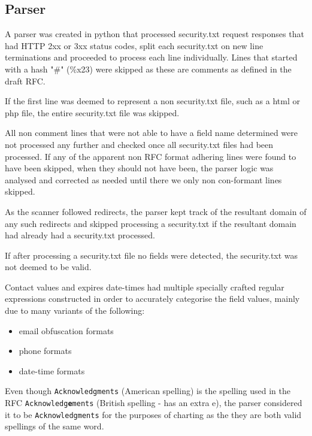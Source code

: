 \documentclass{mscreport}
\begin{document}
\subsection{Parser}

A parser was created in python that processed security.txt request responses that had HTTP 2xx or 3xx status codes, split each security.txt on new line terminations and proceeded to process each line individually. Lines that started with a hash "\#" (\%x23) were skipped as these are comments as defined in the draft RFC.

\vspace{0.3cm} \noindent
If the first line was deemed to represent a non security.txt file, such as a html or php file, the entire security.txt file was skipped.

\vspace{0.3cm} \noindent
All non comment lines that were not able to have a field name determined were not processed any further and checked once all security.txt files had been processed. If any of the apparent non RFC format adhering lines were found to have been skipped, when they should not have been, the parser logic was analysed and corrected as needed until there we only non con-formant lines skipped.

\vspace{0.3cm} \noindent
As the scanner followed redirects, the parser kept track of the resultant domain of any such redirects and skipped processing a security.txt if the resultant domain had already had a security.txt processed.

\vspace{0.3cm} \noindent
If after processing a security.txt file no fields were detected, the security.txt was not deemed to be valid.

\vspace{0.3cm} \noindent
Contact values and expires date-times had multiple specially crafted regular expressions constructed in order to accurately categorise the field values, mainly due to many variants of the following:

\begin{itemize}
	\setlength\itemsep{0.01em}
    \item email obfuscation formats
    \item phone formats
    \item date-time formats
\end{itemize}

\vspace{0.3cm} \noindent
Even though \texttt{Acknowledgments} (American spelling) is the spelling used in the RFC \newline  \texttt{Acknowledg\textbf{e}ments} (British spelling - has an extra e), the parser considered it to be \newline \texttt{Acknowledgments} for the purposes of charting as the they are both valid spellings of the same word.
\end{document}
